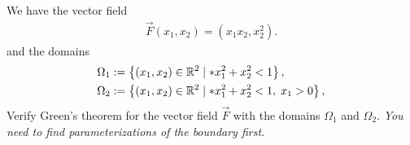 \documentclass[11pt]{article}
\begin{document}



\begin{exercise}
    We have the vector field 
    \begin{gather*}
        \vec F( x_{1}, x_{2} ) = \left( x_{1} x_{2}, x_{2}^{2} \right).
    \end{gather*}
    and the domains 
    \begin{align*}
        \Omega_{1} &:= \left\{ (x_{1},x_{2}) \in \bbR^{2} \suchthat* x_{1}^{2} + x_{2}^{2} < 1 \right\},
        \\
        \Omega_{2} &:= \left\{ (x_{1},x_{2}) \in \bbR^{2} \suchthat* x_{1}^{2} + x_{2}^{2} < 1, \; x_{1} > 0 \right\},
     \end{align*}
    Verify Green's theorem for the vector field $\vec F$ with the domains $\Omega_{1}$ and $\Omega_{2}$. 
    \textit{You need to find parameterizations of the boundary first.}
\end{exercise}
\end{document}
